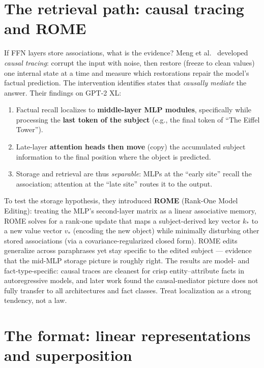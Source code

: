 \documentclass[11pt]{article}
\begin{document}
\section{The retrieval path: causal tracing and ROME}
If FFN layers store associations, what is the evidence? Meng et al.\ \cite{meng2022locating} developed \emph{causal tracing}: corrupt the input with noise, then restore (freeze to clean values) one internal state at a time and measure which restorations repair the model's factual prediction. The intervention identifies states that \emph{causally mediate} the answer. Their findings on GPT-2 XL:
\begin{enumerate}[noitemsep]
  \item Factual recall localizes to \textbf{middle-layer MLP modules}, specifically while processing the \textbf{last token of the subject} (e.g., the final token of ``The Eiffel Tower'').
  \item Late-layer \textbf{attention heads then move} (copy) the accumulated subject information to the final position where the object is predicted.
  \item Storage and retrieval are thus \emph{separable}: MLPs at the ``early site'' recall the association; attention at the ``late site'' routes it to the output.
\end{enumerate}
To test the storage hypothesis, they introduced \textbf{ROME} (Rank-One Model Editing): treating the MLP's second-layer matrix as a linear associative memory, ROME solves for a rank-one update that maps a subject-derived key vector $k_*$ to a new value vector $v_*$ (encoding the new object) while minimally disturbing other stored associations (via a covariance-regularized closed form). ROME edits generalize across paraphrases yet stay specific to the edited subject --- evidence that the mid-MLP storage picture is roughly right. The results are model- and fact-type-specific: causal traces are cleanest for crisp entity--attribute facts in autoregressive models, and later work found the causal-mediator picture does not fully transfer to all architectures and fact classes. Treat localization as a strong tendency, not a law.

\section{The format: linear representations and superposition}
\end{document}
